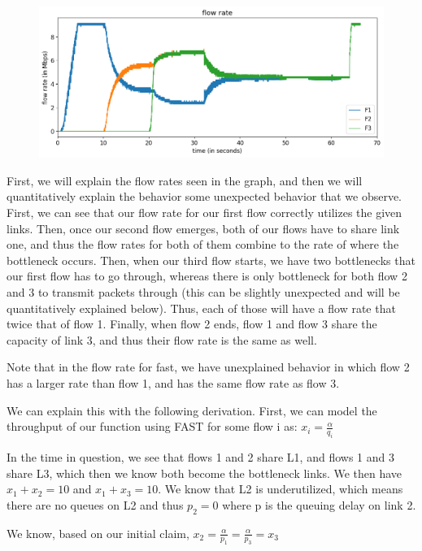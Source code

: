 \documentclass{article}
\begin{document}
\begin{figure}[H]
\centering
\includegraphics[width = \textwidth]{test_case2_fast flow rate.png}
\end{figure}

First, we will explain the flow rates seen in the graph, and then we will quantitatively explain the behavior some unexpected behavior that we observe. First, we can see that our flow rate for our first flow correctly utilizes the given links. Then, once our second flow emerges, both of our flows have to share link one, and thus the flow rates for both of them combine to the rate of where the bottleneck occurs. Then, when our third flow starts, we have two bottlenecks that our first flow has to go through, whereas there is only bottleneck for both flow 2 and 3 to transmit packets through (this can be slightly unexpected and will be quantitatively explained below). Thus, each of those will have a flow rate that twice that of flow 1. Finally, when flow 2 ends, flow 1 and flow 3 share the capacity of link 3, and thus their flow rate is the same as well. 

Note that in the flow rate for fast, we have unexplained behavior in which flow 2 has a larger rate than flow 1, and has the same flow rate as flow 3. 

We can explain this with the following derivation. First, we can model the throughput of our function using FAST for some flow i as: $ x_i = \frac{\alpha}{q_i} $

In the time in question, we see that flows 1 and 2 share L1, and flows 1 and 3 share L3, which then we know both become the bottleneck links. We then have $x_1 + x_2 = 10 $ and $x_1 + x_3 = 10 $. We know that L2 is underutilized, which means there are no queues on L2 and thus $p_2 = 0 $ where p is the queuing delay on link 2.

We know, based on our initial claim, $ x_2 = \frac{\alpha}{p_1} = \frac{\alpha}{p_3}  = x_3$
\end{document}
